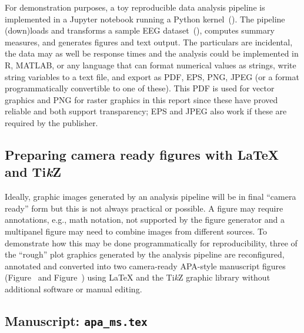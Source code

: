 \documentclass[helv,10pt,man,floatsintext]{apa6}  %
\begin{document}
For demonstration purposes, a toy reproducible data analysis pipeline
is implemented in a Jupyter notebook running a Python
kernel~(\cite{kluEtAl2016}).  The pipeline (down)loads and
transforms a sample EEG dataset~(\cite{Urbach2020z}), computes summary
measures, and generates figures and text output. The particulars are
incidental, the data may as well be response times and the analysis
could be implemented in R, MATLAB, or any language that can format
numerical values as strings, write string variables to a text file,
and export as PDF, EPS, PNG, JPEG (or a format programmatically
convertible to one of these). This PDF is used for vector graphics and
PNG for raster graphics in this report since these have proved
reliable and both support transparency; EPS and JPEG also work if
these are required by the publisher.


\subsection{Preparing camera ready figures with \LaTeX{} and Ti{\it k}Z}

Ideally, graphic images generated by an analysis pipeline will be in
final ``camera ready'' form but this is not always practical or
possible.  A figure may require annotations, e.g., math notation, not
supported by the figure generator and a multipanel figure may need to
combine images from different sources. To demonstrate how this may be
done programmatically for reproducibility, three of the ``rough'' plot
graphics generated by the analysis pipeline are reconfigured, annotated
and converted into two camera-ready APA-style manuscript figures
(Figure~ and Figure~) using \LaTeX{} and
the Ti{\it k}Z graphic library without additional software or manual
editing.


\subsection{Manuscript: \texttt{apa_ms.tex}}
\end{document}
